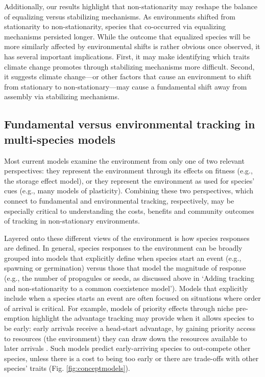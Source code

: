 \documentclass[11pt,letterpaper]{article}
\begin{document}
Additionally, our results highlight that non-stationarity may reshape the balance of equalizing versus stabilizing mechanisms. As environments shifted from stationarity to non-stationarity, species that co-occurred via equalizing mechanisms persisted longer. While the outcome that equalized species will be more similarly affected by environmental shifts is rather obvious once observed, it has several important implications. First, it may make identifying which traits climate change promotes through stabilizing mechanisms more difficult. Second, it suggests climate change---or other factors that cause an environment to shift from stationary to non-stationary---may cause a fundamental shift away from assembly via stabilizing mechanisms. %

\subsection{Fundamental versus environmental tracking in multi-species models}
Most current models examine the environment from only one of two relevant perspectives: they represent the environment through its effects on fitness (e.g., the storage effect model), or they represent the environment as used for species' cues (e.g., many models of plasticity). Combining these two perspectives, which connect to fundamental and environmental tracking, respectively, may be especially critical to understanding the costs, benefits and community outcomes of tracking in non-stationary environments. 

Layered onto these different views of the environment is how species responses are defined. In general, species responses to the environment can be broadly grouped into models that explicitly define when species start an event (e.g., spawning or germination) versus those that model the magnitude of response (e.g., the number of propagules or seeds, as discussed above in `Adding tracking and non-stationarity to a common coexistence model'). Models that explicitly include when a species starts an event are often focused on situations where order of arrival is critical. For example, models of priority effects through niche pre-emption highlight the advantage tracking may provide when it allows species to be early: early arrivals receive a head-start advantage, by gaining priority access to resources (the environment) they can draw down the resources available to later arrivals \citep{fukami2015}. Such models predict early-arriving species to out-compete other species, unless there is a cost to being too early or there are trade-offs with other species' traits (Fig. \ref{fig:conceptmodels}).
\end{document}
